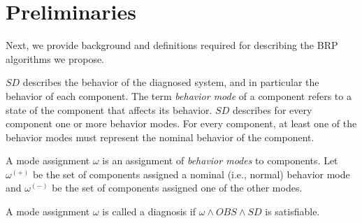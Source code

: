 \section{Preliminaries}
Next, we provide background and definitions required for describing the BRP algorithms we propose.


$SD$ describes the behavior of the diagnosed system, and in particular the behavior of each component. The term {\em behavior mode} of a component refers to a state of the component that affects its behavior. $SD$ describes for every component one or more behavior modes. For every component, at least one of the behavior modes must represent the nominal behavior of the component.

A mode assignment $\omega$ is an assignment of {\em behavior modes} to components. Let $\omega^{(+)}$ be the set of components assigned a nominal (i.e., normal) behavior mode and $\omega^{(-)}$ be the set of components assigned one of the other modes.



\begin{definition}[Diagnosis]
A mode assignment $\omega$ is called a diagnosis if $\omega \wedge OBS \wedge SD$ is satisfiable.
\end{definition}




